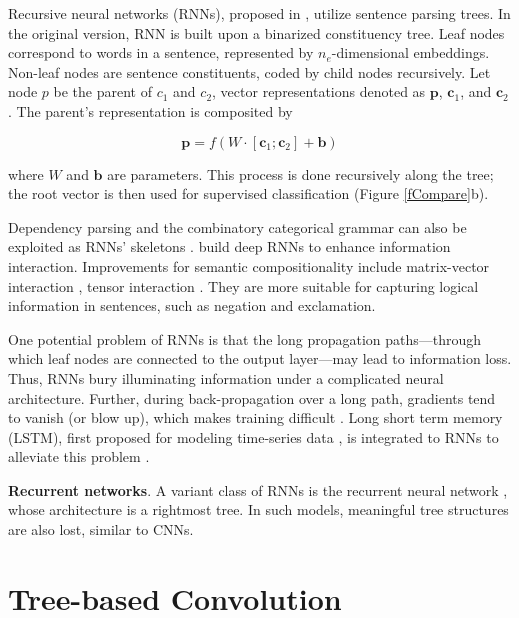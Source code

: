 \documentclass[11pt,a4paper]{article}
\begin{document}
Recursive neural networks (RNNs), proposed in ,
utilize sentence parsing trees.
In the original version, RNN is built upon a binarized constituency tree.
Leaf nodes correspond to words in a sentence, represented by
$n_e$-dimensional embeddings.
Non-leaf nodes are sentence constituents,
coded by child nodes recursively.
Let node $p$ be the parent of $c_1$ and $c_2$,
 vector representations denoted as
$\bm p$, $\bm c_1$, and $\bm c_2$. The parent's representation is composited by

\vspace{-.4cm}
\begin{equation}
\bm p=f(W\cdot[\bm c_1; \bm c_2]+\bm b)\label{eRAE}
\end{equation}

\vspace{-.1cm}

\noindent where $W$ and $\bm b$ are parameters.
This process is done recursively along the tree; the root vector is then used for supervised classification (Figure \ref{fCompare}b).

Dependency parsing and the combinatory categorical grammar can also be exploited
as RNNs' skeletons \cite{ccg,dependencyrnn}.
 build deep RNNs to enhance information interaction.
Improvements for semantic compositionality include matrix-vector interaction \cite{matrixvector}, tensor interaction \cite{RNN}. They are more suitable for 
capturing logical information in sentences, such as negation and exclamation.

One potential problem of RNNs is that the long propagation paths---through which leaf nodes are connected to the output layer---may lead to information loss.
Thus, RNNs bury illuminating information under a complicated neural architecture.
Further, during back-propagation over a long path, gradients tend to vanish (or blow up),
which makes training difficult \cite{difficulty}.
Long short term memory (LSTM), first proposed for modeling
time-series data \cite{lstm}, is integrated to RNNs to alleviate this problem \cite{lstm1,lstm2,lstm3}.

\textbf{Recurrent networks}.
A variant class of RNNs is the recurrent neural network \cite{rnndifficult,responding},
whose architecture is a rightmost tree.
In such models, meaningful tree structures are also lost, similar to CNNs.



\section{Tree-based Convolution}
\end{document}
